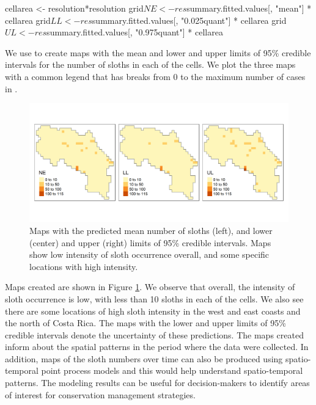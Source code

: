\begin{example}
cellarea <- resolution*resolution
grid$NE <- res$summary.fitted.values[, "mean"] * cellarea
grid$LL <- res$summary.fitted.values[, "0.025quant"] * cellarea
grid$UL <- res$summary.fitted.values[, "0.975quant"] * cellarea
\end{example}

We use  to create maps with the mean and lower and upper limits of 95\% credible intervals for the number of sloths in each of the cells.
We plot the three maps with a common legend that has breaks from 0 to the maximum number of cases in .



\begin{figure}[htbp]
  \centering
  \includegraphics[width=1\textwidth]{tmapintensity}
  \caption{Maps with the predicted mean number of sloths (left), and lower (center) and upper (right) limits of 95\% credible intervals. Maps show low intensity of sloth occurrence overall, and some specific locations with high intensity.}
  \label{fig:tmapintensity}
\end{figure}


Maps created are shown in Figure \ref{fig:tmapintensity}.
We observe that overall, the intensity of sloth occurrence is low, with less than 10 sloths in each of the cells. We also see there are some locations of high sloth intensity in the west and east coasts and the north of Costa Rica. The maps with the lower and upper limits of 95\% credible intervals denote the uncertainty of these predictions.
The maps created inform about the spatial patterns in the period where the data were collected. In addition, maps of the sloth numbers over time can also be produced using spatio-temporal point process models and this would help understand spatio-temporal patterns.
The modeling results can be useful for decision-makers to identify areas of interest for conservation management strategies.



